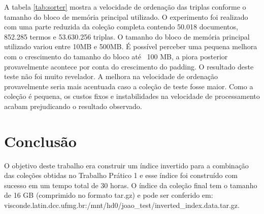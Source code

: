 \documentclass{report}
\begin{document}
A tabela \ref{tab:sorter} mostra a velocidade de ordenação das triplas conforme o tamanho do bloco de memória principal utilizado. O experimento foi
realizado com uma parte reduzida da coleção completa contendo 50.018 documentos, 852.285 termos e 53.630.256 triplas. O tamanho do bloco de memória
principal utilizado variou entre 10MB e 500MB. É possível perceber uma pequena melhora com o crescimento do tamanho do bloco até ~100 MB, a piora
posterior provavelmente acontece por conta do crescimento do padding. O resultado deste teste não foi muito revelador. A melhora na velocidade de 
ordenação provavelmente seria mais acentuada caso a coleção de teste fosse maior. Como a coleção é pequena, os custos fixos e instabilidades na 
velocidade de processamento acabam prejudicando o resultado observado.

\chapter{Conclusão}

O objetivo deste trabalho era construir um índice invertido para a combinação das coleções obtidas no
Trabalho Prático 1 e esse índice foi construído com sucesso em um tempo total de 30 horas. O índice da coleção final
tem o tamanho de 16 GB (comprimido no formato tar.gz) e pode ser conferido em: \newline
visconde.latin.dcc.ufmg.br:/mnt/hd0/joao\_test/inverted\_index.data.tar.gz.
\end{document}
